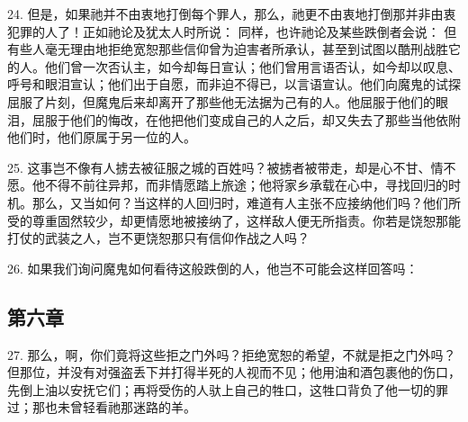 24. 但是，如果祂并不由衷地打倒每个罪人，那么，祂更不由衷地打倒那并非由衷犯罪的人了！正如祂论及犹太人时所说： 同样，也许祂论及某些跌倒者会说： 但有些人毫无理由地拒绝宽恕那些信仰曾为迫害者所承认，甚至到试图以酷刑战胜它的人。他们曾一次否认主，如今却每日宣认；他们曾用言语否认，如今却以叹息、呼号和眼泪宣认；他们出于自愿，而非迫不得已，以言语宣认。他们向魔鬼的试探屈服了片刻，但魔鬼后来却离开了那些他无法据为己有的人。他屈服于他们的眼泪，屈服于他们的悔改，在他把他们变成自己的人之后，却又失去了那些当他依附他们时，他们原属于另一位的人。\par

25. 这事岂不像有人掳去被征服之城的百姓吗？被掳者被带走，却是心不甘、情不愿。他不得不前往异邦，而非情愿踏上旅途；他将家乡承载在心中，寻找回归的时机。那么，又当如何？当这样的人回归时，难道有人主张不应接纳他们吗？他们所受的尊重固然较少，却更情愿地被接纳了，这样敌人便无所指责。你若是饶恕那能打仗的武装之人，岂不更饶恕那只有信仰作战之人吗？\par

26. 如果我们询问魔鬼如何看待这般跌倒的人，他岂不可能会这样回答吗：\par


\subsection{第六章}

\par

27. 那么，啊，你们竟将这些拒之门外吗？拒绝宽恕的希望，不就是拒之门外吗？但那位，并没有对强盗丢下并打得半死的人视而不见；他用油和酒包裹他的伤口，先倒上油以安抚它们；再将受伤的人驮上自己的牲口，这牲口背负了他一切的罪过；那也未曾轻看祂那迷路的羊。\par

